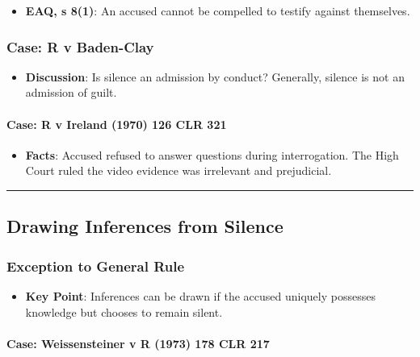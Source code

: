 \begin{itemize}
\tightlist
\item
  \textbf{EAQ, s 8(1)}: An accused cannot be compelled to testify
  against themselves.
\end{itemize}

\subsubsection{Case: R v Baden-Clay}\label{case-r-v-baden-clay}

\begin{itemize}
\tightlist
\item
  \textbf{Discussion}: Is silence an admission by conduct? Generally,
  silence is not an admission of guilt.
\end{itemize}

\paragraph{Case: R v Ireland (1970) 126 CLR
321}\label{case-r-v-ireland-1970-126-clr-321}

\begin{itemize}
\tightlist
\item
  \textbf{Facts}: Accused refused to answer questions during
  interrogation. The High Court ruled the video evidence was irrelevant
  and prejudicial.
\end{itemize}

\begin{center}\rule{0.5\linewidth}{0.5pt}\end{center}

\subsection{  Drawing Inferences from
Silence}\label{drawing-inferences-from-silence}

\subsubsection{Exception to General
Rule}\label{exception-to-general-rule}

\begin{itemize}
\tightlist
\item
  \textbf{Key Point}: Inferences can be drawn if the accused uniquely
  possesses knowledge but chooses to remain silent.
\end{itemize}

\paragraph{Case: Weissensteiner v R (1973) 178 CLR
217}\label{case-weissensteiner-v-r-1973-178-clr-217}

